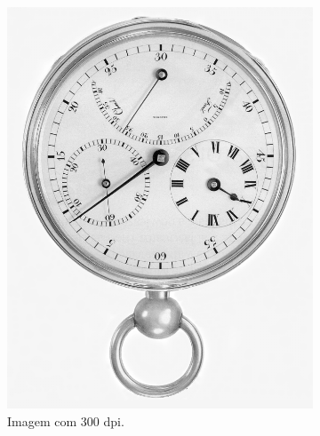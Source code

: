 \documentclass{article}
\begin{document}
\begin{figure}[h]
\begin{subfigure}[b]{0.3\textwidth}
        \end{subfigure}
        \hfill
        \begin{subfigure}[b]{0.3\textwidth}
            \includegraphics[width=\textwidth, angle=180]{figures/clock_a.tif.png}
            \caption{Imagem com 300 dpi.}
            \label{fig:clock_300dpi}
        \end{subfigure}
        \hfill
        \begin{subfigure}[b]{0.3\textwidth}

\end{subfigure}
\end{figure}
\end{document}
